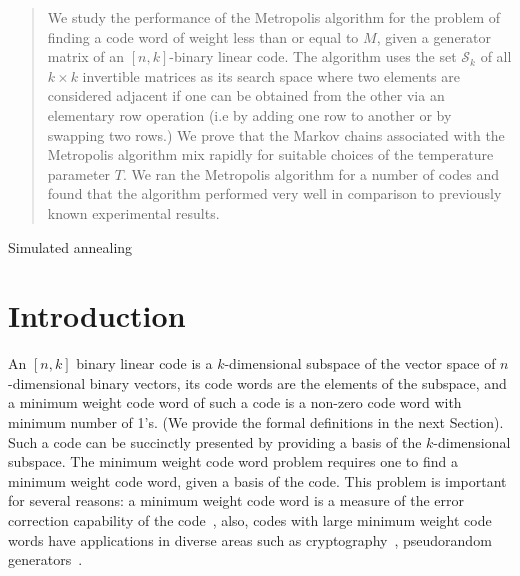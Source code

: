\documentclass{sig-alternate-2013}
\begin{document}
\maketitle

\begin{abstract}
  We study the performance of the Metropolis algorithm for the problem
  of finding a code word of weight less than or equal to $M$, given a
  generator matrix of an $[n,k]$-binary linear code.  The algorithm
  uses the set $\mathcal{S}_k$ of all $k \times k$ invertible matrices
  as its search space where two elements are considered adjacent if
  one can be obtained from the other via an elementary row
  operation (i.e by adding one row to another or by swapping two rows.)
We prove that the Markov chains associated with the
  Metropolis algorithm mix rapidly for suitable choices of the
  temperature parameter $T$. We ran the Metropolis algorithm for a
  number of codes and found that the algorithm performed very well in
  comparison to previously known experimental results.
\end{abstract}

{Simulated annealing}

\section{Introduction}

An $[n,k]$ binary linear code is a $k$-dimensional subspace of the
vector space of $n$-dimensional binary vectors, its code words are the
elements of the subspace, and a minimum weight code word of such a
code is a non-zero code word with minimum number of 1's.  (We provide
the formal definitions in the next Section). Such a code can be
succinctly presented by providing a basis of the $k$-dimensional
subspace. The minimum weight code word problem requires one to find a
minimum weight code word, given a basis of the code. This problem is
important for several reasons: a minimum weight code word is a measure
of the error correction capability of the
code~\cite{error-correction}, also, codes with large minimum weight
code words have applications in diverse areas such as
cryptography~\cite{crypto-appl1, crypto-appl2, secret-sharing}, pseudorandom
generators~\cite{pseudo-random, pseudo-random2}.
\end{document}
